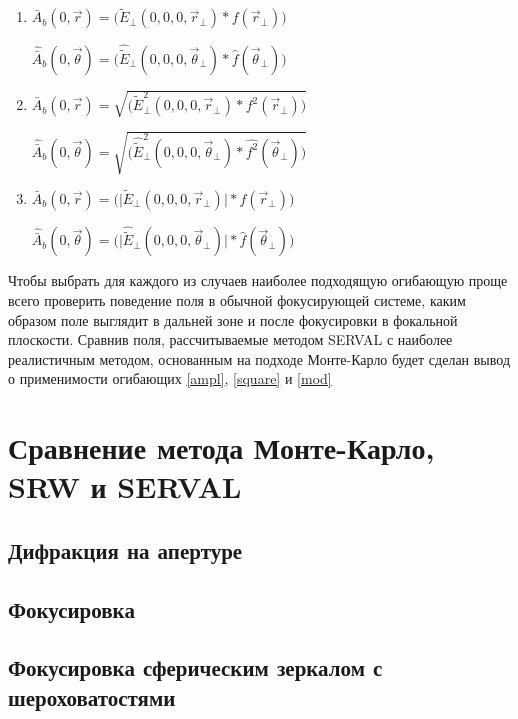 \begin{enumerate}[label=\Roman*.]
	\item \label{ampl} $\bar{A}_{b} (0, \vec{r}) = \big(\widetilde{E}_{\bot}(0, 0, 0, \vec{r}_{\bot}) \ast f(\vec{r}_{\bot})\big)$
	
	$\hat{\bar{A}}_{b} (0, \vec{\theta}) = \big(\hat{\widetilde{E}}_{\bot}(0, 0, 0, \vec{\theta}_{\bot}) \ast \hat{f}(\vec{\theta}_{\bot})\big)$\\

	\item \label{square} $\bar{A}_{b} (0, \vec{r}) = \sqrt{\big(\widetilde{E}^2_{\bot}(0, 0, 0, \vec{r}_{\bot}) \ast f^2(\vec{r}_{\bot})\big)}$
	
	$\hat{\bar{A}}_{b} (0, \vec{\theta}) = \sqrt{\big(\hat{\widetilde{E}}^2_{\bot}(0, 0, 0, \vec{\theta}_{\bot}) \ast \hat{f^2}(\vec{\theta}_{\bot})\big)}$\\
	
	\item \label{mod} $\bar{A}_{b} (0, \vec{r}) = \big(\big|\widetilde{E}_{\bot}(0, 0, 0, \vec{r}_{\bot})\big| \ast f(\vec{r}_{\bot})\big)$
	
	$\hat{\bar{A}}_{b} (0, \vec{\theta}) = \big(\big|\hat{\widetilde{E}}_{\bot}(0, 0, 0, \vec{\theta}_{\bot})\big| \ast \hat{f}(\vec{\theta}_{\bot})\big)$\\
\end{enumerate}
Чтобы выбрать для каждого из случаев наиболее подходящую огибающую проще всего проверить поведение поля в обычной фокусирующей системе, каким образом поле выглядит в дальней зоне и после фокусировки в фокальной плоскости. Сравнив поля, рассчитываемые методом SERVAL с наиболее реалистичным методом, основанным на подходе Монте-Карло будет сделан вывод о применимости огибающих \ref{ampl}, \ref{square} и \ref{mod} 


\section{Сравнение метода Монте-Карло, SRW и SERVAL}

\subsection{Дифракция на апертуре}

\subsection{Фокусировка}

\subsection{Фокусировка сферическим зеркалом с шероховатостями}








